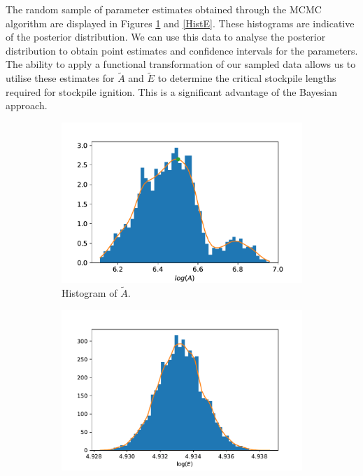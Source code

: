 The random sample of parameter estimates obtained through the MCMC algorithm are displayed in Figures \ref{HistA} and \ref{HistE}. These histograms are indicative of the posterior distribution. We can use this data to analyse the posterior distribution to obtain point estimates and confidence intervals for the parameters. The ability to apply a functional transformation of our sampled data allows us to utilise these estimates for $\tilde{A}$ and $\tilde{E}$ to determine the critical stockpile lengths required for stockpile ignition. This is a significant advantage of the Bayesian approach. \\ 
\begin{figure}[h!]
\centering
\begin{subfigure}{0.5\textwidth}
\centering
\includegraphics[width=\linewidth]{figures/bayesian/hist_A.pdf}
\caption{Histogram of $\tilde{A}$.}
\label{HistA}
\end{subfigure}%
\begin{subfigure}{0.5\textwidth}
\centering
\includegraphics[width=\linewidth]{figures/bayesian/hist_E.pdf}

\end{subfigure}
\end{figure}
